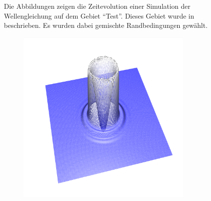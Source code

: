 \documentclass[crop=false,10pt,ngerman]{standalone}
\begin{document}
\begin{figure}[h]
\begin{subfigure}[b]{0.24\textwidth}
          \caption{}
        \end{subfigure}
        \caption[Wellensimulation auf dem Testgebiet]{%
          Die Abbildungen zeigen die Zeitevolution einer Simulation der Wellengleichung auf dem Gebiet \enquote{Test}.
          Dieses Gebiet wurde in \cite{Alberty1998} beschrieben.
          Es wurden dabei gemischte Randbedingungen gewählt.
        }
        \label{fig:test-wave}
      \end{figure}

      \begin{figure}[h]
        \center
        \begin{subfigure}[b]{0.24\textwidth}
          \center
          \includegraphics[trim={2cm 1.5cm 1.2cm 1.0cm},clip,width=0.95\textwidth]{images/quad_wave_0.png}
          \caption{}
        \end{subfigure}
        \begin{subfigure}[b]{0.24\textwidth}
          \center

\end{subfigure}
\end{figure}
\end{document}
